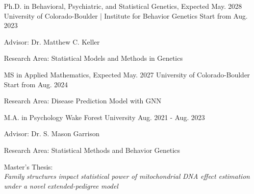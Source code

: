 

\begin{cventries}

  \cventry
    {Ph.D. in Behavioral, Psychiatric, and Statistical Genetics, Expected May. 2028} %
    {University of Colorado-Boulder | Institute for Behavior Genetics} %
    {Start from Aug. 2023} %
    {} %
    {
      \begin{cvitems} %
        \item {Advisor: Dr. Matthew C. Keller}
        \item {Research Area: Statistical Models and Methods in Genetics}
      \end{cvitems}
    }
      \cventry
    {MS in Applied Mathematics, Expected May. 2027} %
    {University of Colorado-Boulder} %
    {Start from Aug. 2024} %
    {} %
    {
      \begin{cvitems} %
        \item {Research Area: Disease Prediction Model with GNN}
      \end{cvitems}
    }

  \cventry
    {M.A. in Psychology} %
    {Wake Forest University} %
    {Aug. 2021 - Aug. 2023} %
    {} %
    {
      \begin{cvitems} %
        \item {Advisor: Dr. S. Mason Garrison}
        \item {Research Area: Statistical Methods and Behavior Genetics}
        \item {Master's Thesis: \\
        \textit{Family structures impact statistical power of mitochondrial DNA effect estimation under a novel extended-pedigree model}}
      \end{cvitems}
    }
    

\end{cventries}
